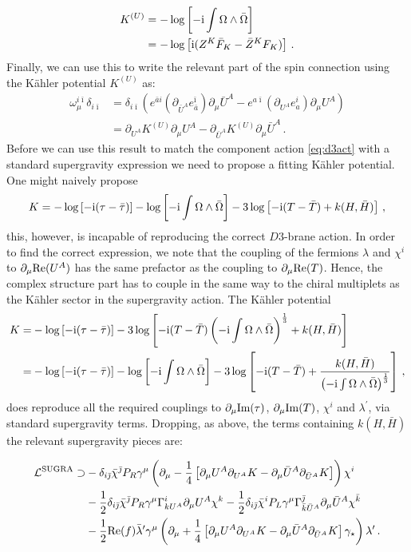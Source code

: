 \documentclass[a4paper,12pt,twoside,openright]{report}
\newcommand{\be}{\begin{equation}}
\newcommand{\ee}{\end{equation}}
\newcommand{\bea}{\begin{equation}\begin{aligned}}
\newcommand{\eea}{\end{aligned}\end{equation}}
\def\rmi{{\rm i}}
\def\ib{{\bar \imath}}
\def\jb{{\bar \jmath}}
\def\rmre{{\rm Re}}
\def\rmim{{\rm Im}}
\begin{document}
\bea 
K^{(U)} &= - \log \left[ -\rmi \int \Omega \wedge \bar{\Omega} \right] \\
&= - \log \left[ \rmi (Z^K \bar{F}_K - \bar{Z}^K F_K ) \right] \,.
\eea
Finally, we can use this to write the relevant part of the spin connection using the Kähler potential $K^{(U)}$ as:
\bea 
\omega_\mu^{i\ib} \delta_{i\ib} &= \delta_{i\ib} \left( e^{\bar{a}i} (\partial_{\bar{U}^A} e^{\ib}_{\bar{a}}) \partial_\mu \bar{U}^A - e^{a\ib} (\partial_{U^A} e^i_a )\partial_\mu U^A\right)\\
&= \partial_{U^A} K^{(U)} \partial_\mu U^A - \partial_{\bar{U}^A} K^{(U)} \partial_\mu \bar{U}^A\,.
\eea
Before we can use this result to match the component action \eqref{eq:d3act} with a standard supergravity expression we need to propose a fitting Kähler potential. One might naively propose 
\be
K = - \log\left[-\rmi (\tau-\bar{\tau})\right] - \log\left[-\rmi \int \Omega \wedge \bar{\Omega}\right] - 3 \log \left[-\rmi(T-\bar{T})  + k(H,\bar{H})\right]\,,
\ee
this, however, is incapable of reproducing the correct $D3$-brane action. In order to find the correct expression, we note that the coupling of the fermions $\lambda$ and $\chi^i$ to $\partial_\mu \rmre(U^A)$ has the same prefactor as the coupling to $\partial_\mu \rmre(T)$. Hence, the complex structure part has to couple in the same way to the chiral multiplets as the Kähler sector in the supergravity action. The Kähler potential
\bea 
K =& - \log\left[-\rmi (\tau-\bar{\tau})\right] - 3 \log \left[-\rmi(T-\bar{T}) \left(-\rmi\int \Omega \wedge \bar{\Omega}\right)^{\frac{1}{3}} + k(H,\bar{H})\right]\\
=&  - \log\left[-\rmi (\tau-\bar{\tau})\right] - \log\left[-\rmi \int \Omega \wedge \bar{\Omega}\right] - 3 \log \left[-\rmi(T-\bar{T})  + \frac{k(H,\bar{H})}{\left(-\rmi\int \Omega \wedge \bar{\Omega}\right)^{\frac{1}{3}}}\right]\,,
\label{eq:deKpot}
\eea
does reproduce all the required couplings to $\partial_{\mu} \rmim(\tau)$, $\partial_\mu \rmim(T)$, $\chi^i$ and $\lambda^\prime$, via standard supergravity terms. Dropping, as above, the terms containing $k(H,\bar{H})$ the relevant supergravity pieces are:

\bea 
\mathcal{L}^{\text{SUGRA}} \supset &-\delta_{i\jb} \bar{\chi}^\jb P_R \gamma^\mu \left( \partial_\mu - \frac{1}{4} \left[\partial_\mu U^A \partial_{U^A} K - \partial_\mu \bar{U}^A \partial_{\bar{U}^A} K \right]\right)\chi^i\\
&- \frac{1}{2} \delta_{i\jb} \bar{\chi}^\jb P_R \gamma^\mu \Gamma^i_{kU^A} \partial_\mu U^A \chi^k-\frac{1}{2} \delta_{i\jb} \bar{\chi}^i P_L \gamma^\mu \Gamma^\jb_{\bar{k}\bar{U}^A} \partial_\mu \bar{U}^A \chi^{\bar{k}}\\
&-\frac{1}{2} \rmre(f)\bar{\lambda}^\prime \gamma^\mu \left( \partial_\mu + \frac{1}{4} \left[\partial_\mu U^A \partial_{U^A} K - \partial_\mu \bar{U}^A \partial_{\bar{U}^A} K\right]\gamma_\star\right)\lambda^\prime\,.
\eea
\end{document}

